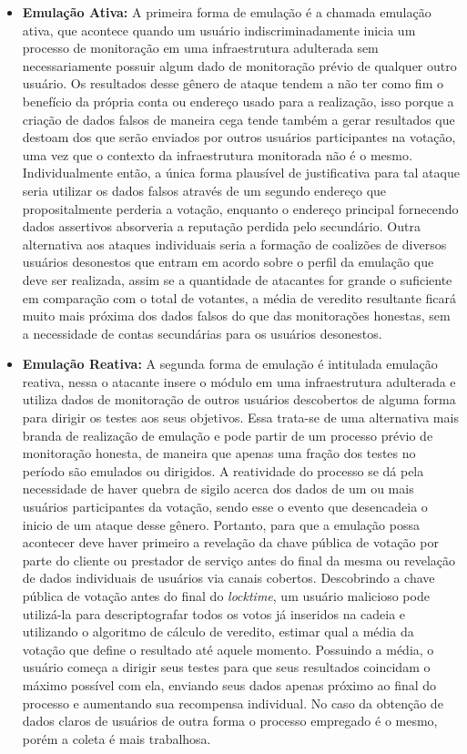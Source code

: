 \begin{itemize}
    \item \textbf{Emulação Ativa:} A primeira forma de emulação é a chamada emulação ativa, que acontece quando um usuário indiscriminadamente inicia um processo de monitoração em uma infraestrutura adulterada sem necessariamente possuir algum dado de monitoração prévio de qualquer outro usuário.
    Os resultados desse gênero de ataque tendem a não ter como fim o benefício da própria conta ou endereço usado para a realização, isso porque a criação de dados falsos de maneira cega tende também a gerar resultados que destoam dos que serão enviados por outros usuários participantes na votação, uma vez que o contexto da infraestrutura monitorada não é o mesmo. Individualmente então, a única forma plausível de justificativa para tal ataque seria utilizar os dados falsos através de um segundo endereço que propositalmente perderia a votação, enquanto o endereço principal fornecendo dados assertivos absorveria a reputação perdida pelo secundário. Outra alternativa aos ataques individuais seria a formação de coalizões de diversos usuários desonestos que entram em acordo sobre o perfil da emulação que deve ser realizada, assim se a quantidade de atacantes for grande o suficiente em comparação com o total de votantes, a média de veredito resultante ficará muito mais próxima dos dados falsos do que das monitorações honestas, sem a necessidade de contas secundárias para os usuários desonestos.
    
    \item \textbf{Emulação Reativa:} A segunda forma de emulação é intitulada emulação reativa, nessa o atacante insere o módulo em uma infraestrutura adulterada e utiliza dados de monitoração de outros usuários descobertos de alguma forma para dirigir os testes aos seus objetivos. Essa trata-se de uma alternativa mais branda de realização de emulação e pode partir de um processo prévio de monitoração honesta, de maneira que apenas uma fração dos testes no período são emulados ou dirigidos. A reatividade do processo se dá pela necessidade de haver quebra de sigilo acerca dos dados de um ou mais usuários participantes da votação, sendo esse o evento que desencadeia o inicio de um ataque desse gênero. Portanto, para que a emulação possa acontecer deve haver primeiro a revelação da chave pública de votação por parte do cliente ou prestador de serviço antes do final da mesma ou revelação de dados individuais de usuários via canais cobertos. Descobrindo a chave pública de votação antes do final do \textit{locktime}, um usuário malicioso pode utilizá-la para descriptografar todos os votos já inseridos na cadeia e utilizando o algoritmo de cálculo de veredito, estimar qual a média da votação que define o resultado até aquele momento. Possuindo a média, o usuário começa a dirigir seus testes para que seus resultados coincidam o máximo possível com ela, enviando seus dados apenas próximo ao final do processo e aumentando sua recompensa individual. No caso da obtenção de dados claros de usuários de outra forma o processo empregado é o mesmo, porém a coleta é mais trabalhosa.
\end{itemize}

